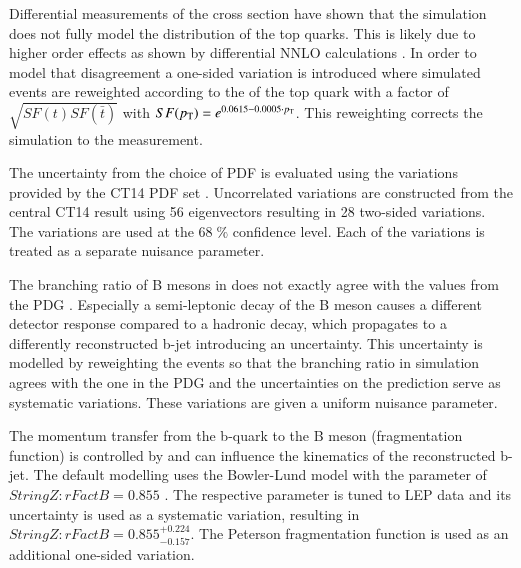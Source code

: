 Differential measurements of the \ttbar cross section \cite{CMS-PAS-TOP-16-011} have shown that the simulation does not fully model the \pt distribution of the top quarks.
This is likely due to higher order effects as shown by differential NNLO calculations \cite{PhysRevLett.116.082003}. In order to model that disagreement a one-sided variation is introduced where simulated events are reweighted according to the \pt of the top quark with a factor of $\sqrt{SF(t)SF(\bar{t})}$ with $SF(p_{\mathrm{T}})=e^{0.0615-0.0005\cdot p_{\mathrm{T}}}$.
This reweighting corrects the simulation to the measurement.

The uncertainty from the choice of PDF is evaluated using the variations provided by the CT14 PDF set \cite{Dulat:2015mca}. Uncorrelated variations are constructed from the central CT14 result using 56 eigenvectors resulting in 28 two-sided variations.
The variations are used at the $68 \;\%$ confidence level. Each of the variations is treated as a separate nuisance parameter.


The branching ratio of B mesons in \PYTHIA does not exactly agree with the values from the PDG  . Especially a semi-leptonic decay of the B meson causes a different detector response compared to a hadronic decay,
which propagates to a differently reconstructed b-jet introducing an uncertainty.
This uncertainty is modelled by reweighting the events so that the branching ratio in simulation agrees with the one in the PDG and the uncertainties on the prediction serve as systematic
variations. These variations are given a uniform nuisance parameter.

The momentum transfer from the b-quark to the B meson (fragmentation function) is controlled by \PYTHIA and can influence the kinematics of the reconstructed b-jet. 
The default modelling uses the Bowler-Lund model \cite{Bowler1981} with the parameter of $StringZ:rFactB = 0.855$ \cite{Skands:2014pea,CMS-PAS-TOP-16-021}.
The respective parameter is tuned to LEP data and its uncertainty is used as a systematic variation, resulting in $StringZ:rFactB = 0.855^{+0.224}_{-0.157}$.
The Peterson fragmentation function \cite{PhysRevD.27.105} is used as an additional one-sided variation. 


